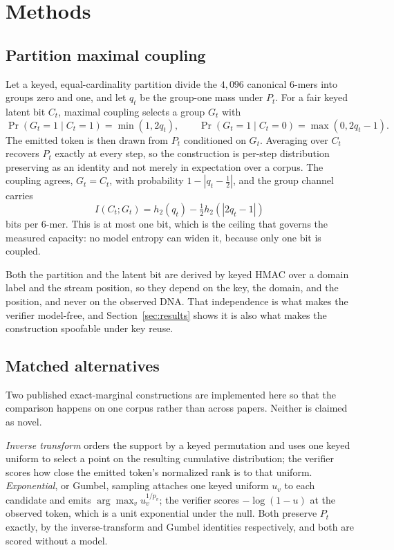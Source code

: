 \section{Methods}

\subsection{Partition maximal coupling}

Let a keyed, equal-cardinality partition divide the $4{,}096$ canonical 6-mers into groups zero and
one, and let $q_t$ be the group-one mass under $P_t$. For a fair keyed latent bit $C_t$, maximal
coupling selects a group $G_t$ with
\[
\Pr(G_t=1\mid C_t=1)=\min(1,2q_t),\qquad
\Pr(G_t=1\mid C_t=0)=\max(0,2q_t-1).
\]
The emitted token is then drawn from $P_t$ conditioned on $G_t$. Averaging over $C_t$ recovers $P_t$
exactly at every step, so the construction is per-step distribution preserving as an identity and not
merely in expectation over a corpus. The coupling agrees, $G_t = C_t$, with probability
$1-|q_t-\tfrac12|$, and the group channel carries
\[
I(C_t;G_t)=h_2(q_t)-\tfrac{1}{2}h_2(|2q_t-1|)
\]
bits per 6-mer. This is at most one bit, which is the ceiling that governs the measured capacity: no
model entropy can widen it, because only one bit is coupled.

Both the partition and the latent bit are derived by keyed HMAC over a domain label and the stream
position, so they depend on the key, the domain, and the position, and never on the observed DNA. That
independence is what makes the verifier model-free, and Section~\ref{sec:results} shows it is also
what makes the construction spoofable under key reuse.

\subsection{Matched alternatives}

Two published exact-marginal constructions are implemented here so that the comparison happens on one
corpus rather than across papers. Neither is claimed as novel.

\emph{Inverse transform} orders the support by a keyed permutation and uses one keyed uniform to select
a point on the resulting cumulative distribution; the verifier scores how close the emitted token's
normalized rank is to that uniform. \emph{Exponential}, or Gumbel, sampling attaches one keyed uniform
$u_v$ to each candidate and emits $\arg\max_v u_v^{1/p_v}$; the verifier scores $-\log(1-u)$ at the
observed token, which is a unit exponential under the null. Both preserve $P_t$ exactly, by the
inverse-transform and Gumbel identities respectively, and both are scored without a model.

